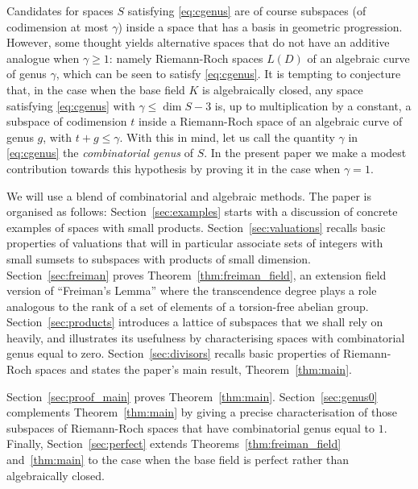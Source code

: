 \documentclass{article}
\theoremstyle{plain}
\theoremstyle{definition}
\theoremstyle{remark}
\renewcommand{\geq}{\geqslant}
\renewcommand{\leq}{\leqslant}
\begin{document}
Candidates for spaces $S$ satisfying \eqref{eq:cgenus} are of course
subspaces (of codimension at most $\gamma$) inside a space that has a
basis in geometric progression.  However, some thought yields
alternative spaces that do not have an additive analogue when
$\gamma\geq 1$: namely Riemann-Roch spaces $L(D)$ of an algebraic
curve of genus $\gamma$, which {can be} seen to
satisfy \eqref{eq:cgenus}.  It is tempting to conjecture that, in the
case when the base field $K$ is algebraically closed, any space
satisfying \eqref{eq:cgenus} {with
  $\gamma\leq\dim S-3$} is, up to multiplication by a constant, a
subspace of codimension $t$ inside a Riemann-Roch space of an
algebraic curve of genus $g$, with $t+g\leq \gamma$. With this in
mind, let us call the quantity $\gamma$ in \eqref{eq:cgenus} the {\em
  combinatorial genus} of $S$.  In the present paper we make a modest
contribution towards this hypothesis by proving it in the case when
$\gamma=1$.

We will use a blend of combinatorial and algebraic methods. The paper
is organised as follows: {Section~\ref{sec:examples}
  starts with a discussion of concrete examples of spaces with small
  products.}  Section~\ref{sec:valuations} recalls basic properties of
valuations that will in particular associate sets of integers with
small sumsets to subspaces with products of small dimension.
Section~\ref{sec:freiman} proves
{Theorem~\ref{thm:freiman_field}}, an extension field
version of ``Freiman's Lemma'' where the transcendence degree plays a
role analogous to the rank of a set of elements of a torsion-free
abelian group.  Section~\ref{sec:products} introduces a lattice of
subspaces that we shall rely on heavily, and illustrates its
usefulness by characterising spaces with combinatorial genus equal to
zero.  Section~\ref{sec:divisors} recalls basic properties of
Riemann-Roch spaces and states the paper's main result,
Theorem~\ref{thm:main}.

Section~\ref{sec:proof_main} proves Theorem~\ref{thm:main}.
Section~\ref{sec:genus0} complements Theorem~\ref{thm:main}
by giving a precise characterisation of those subspaces of
Riemann-Roch spaces that have combinatorial genus equal to $1$.
{
Finally, Section~\ref{sec:perfect} extends Theorems~\ref{thm:freiman_field}
and~\ref{thm:main} to
the case when the base field is perfect rather than algebraically
closed.
}
\end{document}
